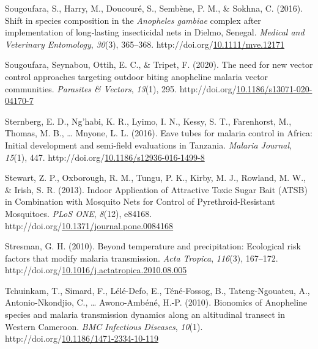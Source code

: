 \documentclass[12pt,twoside]{reedthesis}
\newlength{\cslhangindent}
\newenvironment{CSLReferences}[2] %
 {%
  \setlength{\parindent}{0pt}
  \ifodd #1 \everypar{\setlength{\hangindent}{\cslhangindent}}\ignorespaces\fi
  \ifnum #2 > 0
  \setlength{\parskip}{#2\baselineskip}
  \fi
 }%
 {}
\begin{document}
\begin{CSLReferences}{1}{0}
\leavevmode{}%
Sougoufara, S., Harry, M., Doucouré, S., Sembène, P. M., \& Sokhna, C. (2016). Shift in species composition in the \emph{{Anopheles} gambiae} complex after implementation of long‐lasting insecticidal nets in {Dielmo}, {Senegal}. \emph{Medical and Veterinary Entomology}, \emph{30}(3), 365--368. http://doi.org/\href{https://doi.org/10.1111/mve.12171}{10.1111/mve.12171}

\leavevmode{}%
Sougoufara, Seynabou, Ottih, E. C., \& Tripet, F. (2020). The need for new vector control approaches targeting outdoor biting anopheline malaria vector communities. \emph{Parasites \& Vectors}, \emph{13}(1), 295. http://doi.org/\href{https://doi.org/10.1186/s13071-020-04170-7}{10.1186/s13071-020-04170-7}

\leavevmode{}%
Sternberg, E. D., Ng'habi, K. R., Lyimo, I. N., Kessy, S. T., Farenhorst, M., Thomas, M. B., \ldots{} Mnyone, L. L. (2016). Eave tubes for malaria control in {Africa}: Initial development and semi-field evaluations in {Tanzania}. \emph{Malaria Journal}, \emph{15}(1), 447. http://doi.org/\href{https://doi.org/10.1186/s12936-016-1499-8}{10.1186/s12936-016-1499-8}

\leavevmode{}%
Stewart, Z. P., Oxborough, R. M., Tungu, P. K., Kirby, M. J., Rowland, M. W., \& Irish, S. R. (2013). Indoor {Application} of {Attractive} {Toxic} {Sugar} {Bait} ({ATSB}) in {Combination} with {Mosquito} {Nets} for {Control} of {Pyrethroid}-{Resistant} {Mosquitoes}. \emph{PLoS ONE}, \emph{8}(12), e84168. http://doi.org/\href{https://doi.org/10.1371/journal.pone.0084168}{10.1371/journal.pone.0084168}

\leavevmode{}%
Stresman, G. H. (2010). Beyond temperature and precipitation: {Ecological} risk factors that modify malaria transmission. \emph{Acta Tropica}, \emph{116}(3), 167--172. http://doi.org/\href{https://doi.org/10.1016/j.actatropica.2010.08.005}{10.1016/j.actatropica.2010.08.005}

\leavevmode{}%
Tchuinkam, T., Simard, F., Lélé-Defo, E., Téné-Fossog, B., Tateng-Ngouateu, A., Antonio-Nkondjio, C., \ldots{} Awono-Ambéné, H.-P. (2010). Bionomics of {Anopheline} species and malaria transmission dynamics along an altitudinal transect in {Western} {Cameroon}. \emph{BMC Infectious Diseases}, \emph{10}(1). http://doi.org/\href{https://doi.org/10.1186/1471-2334-10-119}{10.1186/1471-2334-10-119}


\end{CSLReferences}
\end{document}
